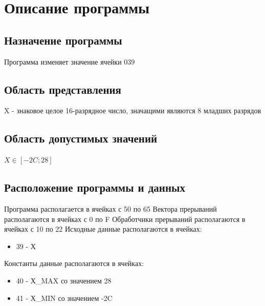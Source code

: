 \documentclass[12pt]{article}
\begin{document}
	\section{Описание программы}
	\subsection{Назначение программы}
	Программа изменяет значение ячейки $ 039 $
	
	\subsection{Область представления}
	X - знаковое целое 16-разрядное число, значащими являются 8 младших разрядов
	
	\subsection{Область допустимых значений}
	
	$ X \in \left[-2C;28\right] $
	
	\subsection{Расположение программы и данных}
	Программа располагается в ячейках с 50 по 65
	Вектора прерываний располагаются в ячейках с 0 по F
	Обработчики прерываний располагаются в ячейках с 10 по 22
	Исходные данные располагаются в ячейках:
	\begin{itemize}
		\item 39 - Х
	\end{itemize}
	Константы данные располагаются в ячейках:
	\begin{itemize}
		\item 40 - Х_MAX со значением 28
		\item 41 - Х_MIN со значением -2C
	\end{itemize}
	
\end{document}
